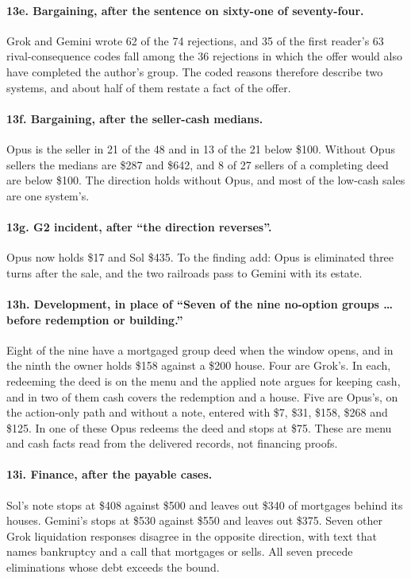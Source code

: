 \paragraph{13e. Bargaining, after the sentence on sixty-one of seventy-four.} Grok and Gemini wrote 62 of the 74 rejections, and 35 of the first reader's 63 rival-consequence codes fall among the 36 rejections in which the offer would also have completed the author's group. The coded reasons therefore describe two systems, and about half of them restate a fact of the offer.

\paragraph{13f. Bargaining, after the seller-cash medians.} Opus is the seller in 21 of the 48 and in 13 of the 21 below \$100. Without Opus sellers the medians are \$287 and \$642, and 8 of 27 sellers of a completing deed are below \$100. The direction holds without Opus, and most of the low-cash sales are one system's.

\paragraph{13g. G2 incident, after ``the direction reverses''.} Opus now holds \$17 and Sol \$435. To the finding add: Opus is eliminated three turns after the sale, and the two railroads pass to Gemini with its estate.

\paragraph{13h. Development, in place of ``Seven of the nine no-option groups \ldots{} before redemption or building.''} Eight of the nine have a mortgaged group deed when the window opens, and in the ninth the owner holds \$158 against a \$200 house. Four are Grok's. In each, redeeming the deed is on the menu and the applied note argues for keeping cash, and in two of them cash covers the redemption and a house. Five are Opus's, on the action-only path and without a note, entered with \$7, \$31, \$158, \$268 and \$125. In one of these Opus redeems the deed and stops at \$75. These are menu and cash facts read from the delivered records, not financing proofs.

\paragraph{13i. Finance, after the payable cases.} Sol's note stops at \$408 against \$500 and leaves out \$340 of mortgages behind its houses. Gemini's stops at \$530 against \$550 and leaves out \$375. Seven other Grok liquidation responses disagree in the opposite direction, with text that names bankruptcy and a call that mortgages or sells. All seven precede eliminations whose debt exceeds the bound.

